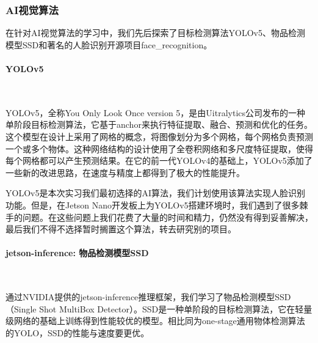 \documentclass[UTF8]{article}
\begin{document}
\subsubsection{AI视觉算法} 
在针对AI视觉算法的学习中，我们先后探索了目标检测算法YOLOv5、物品检测模型SSD和著名的人脸识别开源项目face\_recognition。

\paragraph{YOLOv5}~{}


YOLOv5，全称You Only Look Once version 5，是由Uitralytics公司发布的一种单阶段目标检测算法，它基于anchor来执行特征提取、融合、预测和优化的任务。这个模型在设计上采用了网格的概念，将图像划分为多个网格，每个网格负责预测一个或多个物体。这种网络结构的设计使用了全卷积网络和多尺度特征提取，使得每个网格都可以产生预测结果。在它的前一代YOLOv4的基础上，YOLOv5添加了一些新的改进思路，在速度与精度上都得到了极大的性能提升。

YOLOv5是本次实习我们最初选择的AI算法，我们计划使用该算法实现人脸识别功能。但是，在Jetson Nano开发板上为YOLOv5搭建环境时，我们遇到了很多棘手的问题。在这些问题上我们花费了大量的时间和精力，仍然没有得到妥善解决，最后我们不得不选择暂时搁置这个算法，转去研究别的项目。

\paragraph{jetson-inference: 物品检测模型SSD}~{}

通过NVIDIA提供的jetson-inference推理框架，我们学习了物品检测模型SSD（Single Shot MultiBox Detector）。SSD是一种单阶段的目标检测算法，它在轻量级网络的基础上训练得到性能较优的模型。相比同为one-stage通用物体检测算法的YOLO，SSD的性能与速度要更优。
\end{document}
